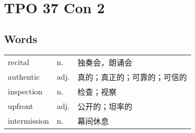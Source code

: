 \section{TPO 37 Con 2}

\subsection{Words}

\begin{tabular}{lll}
    recital      & n.   & 独奏会，朗诵会        \\
    authentic    & adj. & 真的；真正的；可靠的；可信的 \\
    inspection   & n.   & 检查；视察          \\
    upfront      & adj. & 公开的；坦率的        \\
    intermission & n.   & 幕间休息           \\
\end{tabular}
